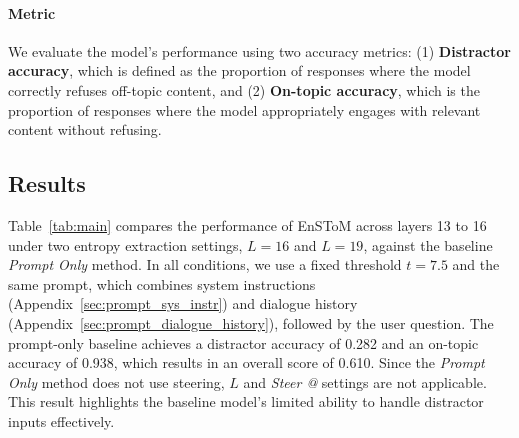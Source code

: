 \documentclass[11pt]{article}
\begin{document}
\paragraph{Metric} 
\label{para:metric}
We evaluate the model's performance using two accuracy metrics: (1) \textbf{Distractor accuracy}, which is defined as the proportion of responses where the model correctly refuses off-topic content, and (2) \textbf{On-topic accuracy}, which is the proportion of responses where the model appropriately engages with relevant content without refusing.


\begin{table}[t]
    \centering
    \footnotesize
    \caption{Performance of EnSToM at Ministral-8b-Instruct-2410.}
    \label{tab:ministral}
\end{table}




\subsection{Results}\label{sec:results}

Table~\ref{tab:main} compares the performance of EnSToM across layers 13 to 16 under two entropy extraction settings, \( L = 16 \) and \( L = 19 \), against the baseline \textit{Prompt Only} method. In all conditions, we use a fixed threshold \( t = 7.5 \) and the same prompt, which combines system instructions (Appendix~\ref{sec:prompt_sys_instr}) and dialogue history (Appendix~\ref{sec:prompt_dialogue_history}), followed by the user question. The prompt-only baseline achieves a distractor accuracy of 0.282 and an on-topic accuracy of 0.938, which results in an overall score of 0.610. Since the \textit{Prompt Only} method does not use steering, \( L \) and \textit{Steer @} settings are not applicable. This result highlights the baseline model's limited ability to handle distractor inputs effectively.
\end{document}
